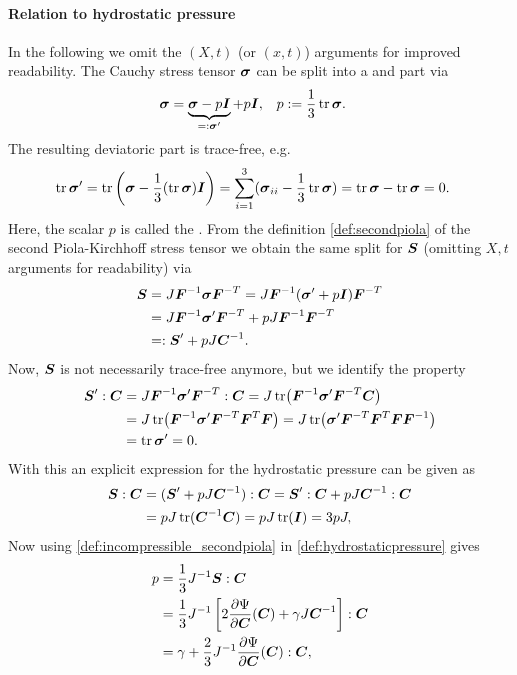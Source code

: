 \paragraph{Relation to hydrostatic pressure}
In the following we omit the $(X,t)$ (or $(x,t)$) arguments for improved readability.
The Cauchy stress tensor $\vsig$ can be split into a  and  part via
\begin{align}
	\vsig &= \underbrace{\vsig - p\vI}_{=:\vsig'} + p\vI, & p &:= \frac{1}{3}\tr\vsig.
\end{align}
The resulting deviatoric part is trace-free, e.g.
\begin{align}
	\tr{\vsig'} &= \tr\left(\vsig - \frac{1}{3}(\tr\vsig)\vI\right) = \suml{i=1}{3}(\vsig_{ii} - \frac{1}{3}\tr\vsig) = \tr\vsig - \tr\vsig = 0.
\end{align}
Here, the scalar $p$ is called the .
From the definition \eqref{def:secondpiola} of the second Piola-Kirchhoff stress tensor we obtain the same split for $\vS$
(omitting $X,t$ arguments for readability) via
\begin{align}
	\vS &= J\vF^{-1}\vsig\vF^{-T} = J\vF^{-1}(\vsig' + p\vI)\vF^{-T}\\
		&= J\vF^{-1}\vsig'\vF^{-T} + pJ\vF^{-1}\vF^{-T}\\
		&=: \vS' + pJ\vC^{-1}.
\end{align}
Now, $\vS$ is not necessarily trace-free anymore, but we identify the property
\begin{align}
	\vS' : \vC &= J\vF^{-1}\vsig'\vF^{-T} : \vC = J\tr\bigl(\vF^{-1}\vsig'\vF^{-T}\vC\bigr)\\
		&= J\tr\bigl(\vF^{-1}\vsig'\vF^{-T}\vF^T\vF\bigr) = J\tr\bigl(\vsig'\vF^{-T}\vF^T\vF\vF^{-1}\bigr)\\
		&= \tr\vsig' = 0.
\end{align}
With this an explicit expression for the hydrostatic pressure can be given as
\begin{align}
	\vS : \vC &= (\vS' + pJ\vC^{-1}) : \vC = \vS': \vC + pJ\vC^{-1} : \vC\\
	&= pJ\tr(\vC^{-1}\vC) = pJ\tr(\vI) = 3pJ,\label{def:hydrostaticpressure}
\end{align}
Now using \eqref{def:incompressible_secondpiola} in \eqref{def:hydrostaticpressure} gives
\begin{align}
	p &= \frac{1}{3}J^{-1}\vS : \vC\\
	  &= \frac{1}{3}J^{-1}\left[2\d{\Psi}{\vC}(\vC) + \gamma J\vC^{-1}\right] : \vC\\
	  &= \gamma + \frac{2}{3}J^{-1}\d{\Psi}{\vC}(\vC):\vC,
\end{align}
